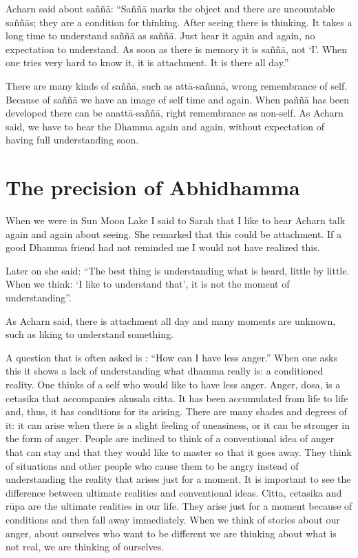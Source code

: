 \documentclass{book}
\begin{document}
Acharn said about saññā: ``Saññā marks the object and there
are uncountable saññās; they are a condition for thinking. After seeing
there is thinking. It takes a long time to understand saññā as saññā.
Just hear it again and again, no expectation to understand. As soon as
there is memory it is saññā, not `I'. When one tries very hard to know
it, it is attachment. It is there all day.''

There are many kinds of saññā, such as attā-sañnnā, wrong
remembrance of self. Because of saññā we have an image of self time and
again. When paññā has been developed there can be anattā-saññā, right
remembrance as non-self. As Acharn said, we have to hear the Dhamma
again and again, without expectation of having full understanding soon.




\section*{The precision of Abhidhamma}



When we were in Sun Moon Lake I said to Sarah that I like to
hear Acharn talk again and again about seeing. She remarked that this
could be attachment. If a good Dhamma friend had not reminded me I would
not have realized this. 

Later on she said: ``The best thing is understanding what is
heard, little by little. When we think: `I like to understand that', it
is not the moment of understanding''. 

As Acharn said, there is attachment all day and many moments
are unknown, such as liking to understand something. 

A question that is often asked is : ``How can I have less
anger.'' When one asks this it shows a lack of understanding what dhamma
really is: a conditioned reality. One thinks of a self who would like to
have less anger. Anger, dosa, is a cetasika that accompanies akusala
citta. It has been accumulated from life to life and, thus, it has
conditions for its arising. There are many shades and degrees of it: it
can arise when there is a slight feeling of uneasiness, or it can be
stronger in the form of anger. People are inclined to think of a
conventional idea of anger that can stay and that they would like to
master so that it goes away. They think of situations and other people
who cause them to be angry instead of understanding the reality that
arises just for a moment. It is important to see the difference between
ultimate realities and conventional ideas. Citta, cetasika and rūpa are
the ultimate realities in our life. They arise just for a moment because
of conditions and then fall away immediately. When we think of stories
about our anger, about ourselves who want to be different we are
thinking about what is not real, we are thinking of ourselves.
\end{document}
